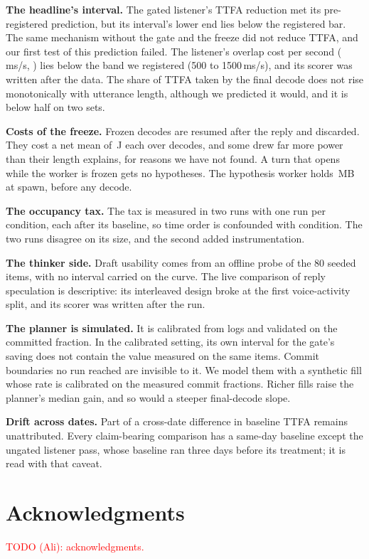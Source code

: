 \documentclass[a4paper,10pt,twocolumn]{article}
\newif\ifanonymous
\begin{document}
\textbf{The headline's interval.} The gated listener's TTFA reduction met its
pre-registered prediction, but its interval's lower end lies below the
registered bar. The same mechanism without the gate and the freeze did not
reduce TTFA, and our first test of this prediction failed. The listener's
overlap cost per second (\ListenerC\,ms/s, \ListenerCCI) lies below the band
we registered (500 to 1500\,ms/s), and its scorer was written after the data. The share of TTFA
taken by the final decode does not rise monotonically with utterance length,
although we predicted it would, and it is below half on two sets.

\textbf{Costs of the freeze.} Frozen decodes are resumed after the reply and
discarded. They cost a net mean of \StaleMean\,J each over \StaleN{} decodes, and
some drew far more power than their length explains, for reasons we have not
found. A turn that opens while the worker is frozen gets no hypotheses. The
hypothesis worker holds \WorkerPSS\,MB at spawn, before any decode.

\textbf{The occupancy tax.} The tax is measured in two runs with one run per
condition, each after its baseline, so time order is confounded with
condition. The two runs disagree on its size, and the second added
instrumentation.

\textbf{The thinker side.} Draft usability comes from an offline probe of
the 80 seeded items, with no interval carried on the curve. The live comparison of reply speculation is
descriptive: its interleaved design broke at the first voice-activity split,
and its scorer was written after the run.

\textbf{The planner is simulated.} It is calibrated from logs and validated
on the committed fraction. In the calibrated setting, its own interval for the
gate's saving does not contain the value measured on the same items. Commit
boundaries no run reached are invisible to it. We model them with a synthetic
fill whose rate is calibrated on the measured commit fractions. Richer fills
raise the planner's median gain, and so would a steeper final-decode slope.

\textbf{Drift across dates.} Part of a cross-date difference in baseline TTFA
remains unattributed. Every claim-bearing comparison has a same-day
baseline except the ungated listener pass, whose baseline ran three days
before its treatment; it is read with that caveat.

\ifanonymous\else
\section*{Acknowledgments}
\textcolor{red}{TODO (Ali): acknowledgments.}
\fi
\end{document}
